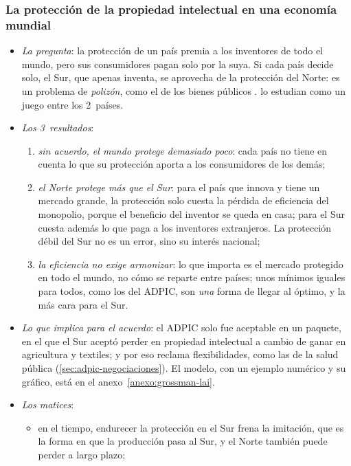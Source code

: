 \documentclass[11pt]{article}
\begin{document}
\subsubsection{La protección de la propiedad intelectual\cortetitulo{} en una economía mundial}\label{sec:grossman-lai}

\begin{itemize}
\item \emph{La pregunta}: la protección de un país premia a los inventores de todo el mundo, pero sus consumidores pagan solo por la suya. Si cada país decide solo, el Sur, que apenas inventa, se aprovecha de la protección del Norte: es un problema de \emph{polizón}, como el de los bienes públicos . \textcite{GrossmanLai2004International} lo estudian como un juego entre los 2~países.
\item \emph{Los 3~resultados}:
  \begin{enumerate}
  \item \emph{sin acuerdo, el mundo protege demasiado poco}: cada país no tiene en cuenta lo que su protección aporta a los consumidores de los demás;
  \item \emph{el Norte protege más que el Sur}: para el país que innova y tiene un mercado grande, la protección solo cuesta la pérdida de eficiencia del monopolio, porque el beneficio del inventor se queda en casa; para el Sur cuesta además lo que paga a los inventores extranjeros. La protección débil del Sur no es un error, sino su interés nacional;
  \item \emph{la eficiencia no exige armonizar}: lo que importa es el mercado protegido en todo el mundo, no cómo se reparte entre países; unos mínimos iguales para todos, como los del ADPIC, son \emph{una} forma de llegar al óptimo, y la más cara para el Sur.
  \end{enumerate}
\item \emph{Lo que implica para el acuerdo}: el ADPIC solo fue aceptable en un paquete, en el que el Sur aceptó perder en propiedad intelectual a cambio de ganar en agricultura y textiles; y por eso reclama flexibilidades, como las de la salud pública (\ref{sec:adpic-negociaciones}). El modelo, con un ejemplo numérico y su gráfico, está en el anexo~\ref{anexo:grossman-lai}.
\item \emph{Los matices}:
  \begin{itemize}
  \item en el tiempo, endurecer la protección en el Sur frena la imitación, que es la forma en que la producción pasa al Sur, y el Norte también puede perder a largo plazo\nocite{Helpman1993Innovation};

\end{itemize}
\end{itemize}
\end{document}
